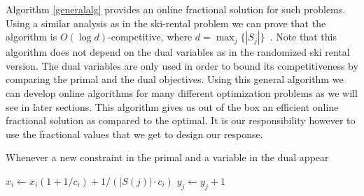 Algorithm \ref{generalalg} provides an online fractional solution for such problems. Using a similar analysis as in the ski-rental problem we can prove that the algorithm is $O(\log d)$-competitive, where \mbox{$d = \max_j\{|S_j|\}$}~\cite{buchbinder09:survey}.
Note that this algorithm does not depend on the dual variables as in the randomized ski rental version. The dual variables are only used in order to bound its competitiveness by comparing the primal and the dual objectives.
Using this general algorithm we can develop online algorithms for many different optimization problems as we will see in later sections. This algorithm gives us out of the box an efficient online fractional solution as compared to the optimal. It is our responsibility however to use the fractional values that we get to design our response.

\begin{algorithm}
\caption{Whenever a new constraint in the primal and a variable in the dual appear}
\label{generalalg}
\begin{algorithmic}[1]
    \STATE $x_i \leftarrow x_i (1 + 1/c_i) + 1/(|S(j)| \cdot c_i)$ 
  \ENDFOR
  \STATE $y_j \leftarrow y_j + 1$
\ENDWHILE
\end{algorithmic}
\end{algorithm}



